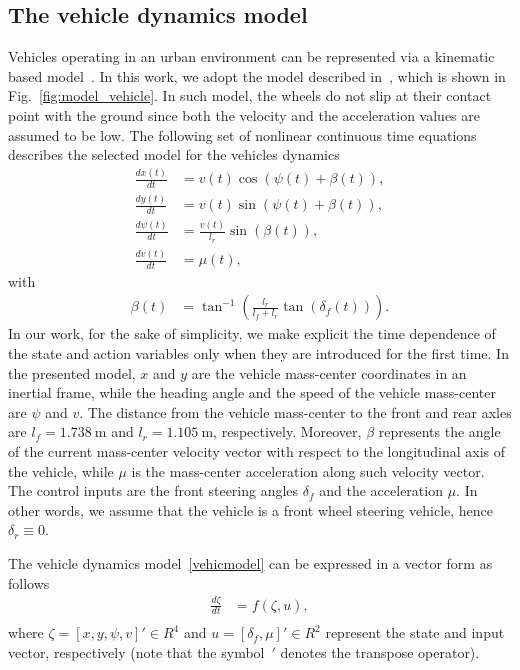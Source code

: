 \subsection{The vehicle dynamics model}
\label{sub_sec:3-a}
Vehicles operating in an urban environment can be represented via a kinematic based model~\cite{bicycle_Frazzoli}. In this work, we adopt the model described in~\cite{bicycle_Borrelli}, which is shown in \mbox{Fig.~\ref{fig:model_vehicle}}. In such model, the wheels do not slip at their contact point with the ground since both the velocity and the acceleration values are assumed to be low. 
The following set of nonlinear continuous time equations describes the selected model for the vehicles dynamics
\begin{subequations}
\label{vehicmodel}
\begin{align}
	\frac{dx(t)}{dt} &=v(t) \cos (\psi(t)+\beta(t)), \\
	\frac{dy(t)}{dt} &=v(t) \sin (\psi(t)+\beta(t)), \\
	\frac{d\psi(t)}{dt} &=\frac{v(t)}{l_{r}} \sin (\beta(t)), \\
	\frac{dv(t)}{dt} &= \mu(t), 
\end{align}
\end{subequations}
\noindent with
\begin{subequations}[resume]
\begin{align}
	\beta(t) &=\tan ^{-1}\left(\frac{l_{r}}{l_{f}+l_{r}} \tan \left(\delta_{f}(t)\right)\right).
\end{align}
\end{subequations}
In our work, for the sake of simplicity, we make explicit the time  dependence of the state and action variables only when they are introduced for the first time. In the presented model, $x$ and $y$ are the vehicle mass-center coordinates in an inertial frame, while the heading angle and the speed of the vehicle mass-center are $\psi$ and $v$. The distance from the vehicle mass-center to the front and rear axles are $l_f= \SI{1.738}{\metre}$ and $l_r=\SI{1.105}{\metre}$, respectively. Moreover, $\beta$ represents the angle of the current mass-center velocity vector with respect to the longitudinal axis of
the vehicle, while $\mu$ is the mass-center acceleration along such velocity vector. The control inputs are the front steering angles $\delta_f$ and the acceleration $\mu$. In other words, we assume that the vehicle is a front wheel steering vehicle, hence $\delta_r \equiv 0$.   

The vehicle dynamics model~\eqref{vehicmodel}  can be expressed in a vector form as follows
\begin{equation}
\begin{aligned}
	\frac{d\zeta}{dt}  & = f(\zeta,u), \\
\end{aligned}
\end{equation}
\noindent where $\zeta=[x,y, \psi, v]' \in {R}^{4}$ and $u=[\delta_f ,\mu]' \in {R}^{2}$ represent the state and input vector, respectively (note that the \mbox{symbol $'$} denotes the transpose operator).


